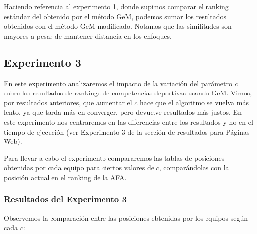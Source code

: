\par Haciendo referencia al experimento 1, donde supimos comparar el ranking est\'andar del obtenido por el m\'etodo GeM, podemos sumar los resultados obtenidos con el m\'etodo GeM modificado. Notamos que las similitudes son mayores  a pesar de mantener distancia en los enfoques.

\newpage

\subsection{Experimento 3}

\par En este experimento analizaremos el impacto de la variación del parámetro $c$ sobre los resultados de rankings de competencias deportivas usando GeM. Vimos, por resultados anteriores, que aumentar el $c$ hace que el algoritmo se vuelva más lento, ya que tarda más en converger, pero devuelve resultados más justos. En este experimento nos centraremos en las diferencias entre los resultados y no en el tiempo de ejecución (ver Experimento 3 de la sección de resultados para Páginas Web).

\par Para llevar a cabo el experimento compararemos las tablas de posiciones obtenidas por cada equipo para ciertos valores de $c$, comparándolas con la posición actual en el ranking de la AFA.

\subsubsection{Resultados del Experimento 3}

\par Observemos la comparación entre las posiciones obtenidas por los equipos según cada $c$:

